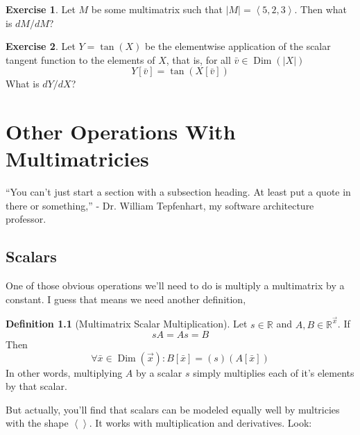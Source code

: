 \documentclass[12pt]{book}
\theoremstyle{plain}
\theoremstyle{definition}
\newtheorem{definition}{Definition}[chapter]
\newtheorem{exercise}{Exercise}[chapter]
\theoremstyle{ppart}
\theoremstyle{case}
\theoremstyle{solution}
\DeclareMathOperator{\Dim}{Dim}
\newcommand{\shape}[1]{\left|#1\right|}
\begin{document}
\begin{exercise}
Let $M$ be some multimatrix such that $\shape{M} = \left<5,2,3\right>$. Then what is
$dM/dM$?
\end{exercise}

\begin{exercise}
Let $Y = \tan(X)$ be the elementwise application of the scalar tangent function to
the elements of $X$, that is, for all $\bar{v} \in \Dim(\shape{X})$
\[ Y[\bar{v}] = \tan(X[\bar{v}]) \]
What is $dY/dX$?
\end{exercise}

\chapter{Other Operations With Multimatricies}

\begin{displayquote}
``You can't just start a section with a subsection heading. At least put a quote
in there or something,'' - Dr. William Tepfenhart, my software architecture professor.
\end{displayquote}

\section{Scalars}

One of those obvious operations we'll need to do is multiply
a multimatrix by a constant. I guess that means we need another definition,

\begin{definition}[Multimatrix Scalar Multiplication]
Let $s \in \mathbb{R}$ and $A, B \in \mathbb{R}^{\vec{x}}$. If
\[ sA = As = B \]
Then
\[ \forall \bar{x} \in \Dim(\vec{x}):
   B[\bar{x}] = (s)(A[\bar{x}]) \]
In other words, multiplying $A$ by a scalar $s$ simply multiplies each of
it's elements by that scalar.
\end{definition}

But actually, you'll find that scalars can be modeled equally well by multricies
with the shape $\left<\right>$. It works with multiplication and derivatives. Look:
\end{document}
